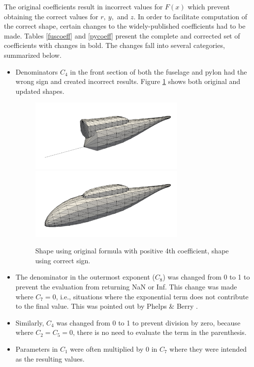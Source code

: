 \documentclass[journal]{new-aiaa}
\begin{document}
The original coefficients result in incorrect values for $F\left(x\right)$ which prevent obtaining the correct values for $r, \ y,$ and $z$. In order to facilitate computation of the correct shape, certain changes to the
widely-published coefficients had to be made.
Tables \ref{fuscoeff} and \ref{pycoeff} present the complete and corrected set of coefficients with changes in bold.
The changes fall into several categories, summarized below.
\begin{itemize}
\item Denominators $C_{4}$ in the front section of both the fuselage and pylon had the wrong sign
and created incorrect results.
Figure \ref{badc4} shows both original and updated shapes.
\begin{figure} \begin{centering}
\includegraphics[width=3.0in]{img_badc4.png}
\includegraphics[width=3.0in]{img_good.png}
\caption{Shape using original formula with positive 4th coefficient, shape using correct sign.}
\label{badc4}
\end{centering}\end{figure}%
\item The denominator in the outermost exponent ($C_{8}$) was changed from 0 to 1 to prevent the evaluation from returning NaN or Inf.
This change was made where $C_{7}=0$, i.e., situations where the exponential term does not contribute to the final value.
This was pointed out by Phelps \& Berry \cite{nasa87762}.
\item Similarly, $C_{4}$ was changed from 0 to 1 to prevent division by zero, because
where $C_{2}=C_{5}=0$, there is no need to evaluate the term in the parenthesis.
\item Parameters in $C_{1}$ were often multiplied by 0 in $C_{7}$ where they were intended as the resulting values.

\end{itemize}
\end{document}
